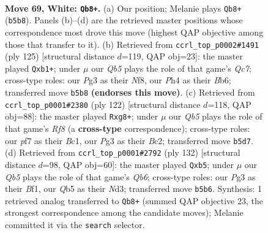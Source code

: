 \documentclass[11pt]{article}
\begin{document}
\clearpage

\begin{figure}[p]\centering
\begin{subfigure}{0.46\textwidth}\centering
\resizebox{\linewidth}{!}{%
\newchessgame
\chessboard[
  setfen={4k3/3q1p2/4bn2/1Q5n/1Bp4P/p4pP1/P6K/4R3 w - - 6 69},
  showmover=false,
  pgfstyle=straightmove, color=movearrow, markmove={b5-b8}
]}
\caption{}
\end{subfigure}\hfill
\begin{subfigure}{0.46\textwidth}\centering
\resizebox{\linewidth}{!}{%
\newchessgame
\chessboard[
  setfen={5n2/6pk/1b5p/p2QNP2/3P4/6PP/2q2B2/1R4K1 b - - 0 63},
  showmover=false,
  pgfstyle=straightmove, color=movearrow, markmove={c2-b1}
]}
\caption{}
\end{subfigure}
\\[4pt]
\begin{subfigure}{0.46\textwidth}\centering
\resizebox{\linewidth}{!}{%
\newchessgame
\chessboard[
  setfen={5Rrk/8/3p2q1/p2Pn3/Pbp1P1b1/6QP/2B5/2B4K w - - 1 62},
  showmover=false,
  pgfstyle=straightmove, color=movearrow, markmove={f8-g8}
]}
\caption{}
\end{subfigure}\hfill
\begin{subfigure}{0.46\textwidth}\centering
\resizebox{\linewidth}{!}{%
\newchessgame
\chessboard[
  setfen={8/5bk1/1Q2n1p1/1p1pP3/3q4/3N1pP1/5P2/5BK1 w - - 2 67},
  showmover=false,
  pgfstyle=straightmove, color=movearrow, markmove={b6-b5}
]}
\caption{}
\end{subfigure}
\caption{\textbf{Move 69, White: \texttt{Qb8+}.} (a) Our position; Melanie plays \texttt{Qb8+} (\texttt{b5b8}). Panels (b)--(d) are the retrieved master positions whose correspondence most drove this move (highest QAP objective among those that transfer to it). (b) Retrieved from \texttt{ccrl\_top\_p0002\#1491} (ply 125) [structural distance $d$=119, QAP obj=23]: the master played \texttt{Qxb1+}; under $\mu$ our \emph{Qb5} plays the role of that game's \emph{Qc7}; cross-type roles: our \emph{P}g3 as their \emph{N}f8, our \emph{P}h4 as their \emph{B}b6; transferred move \texttt{b5b8} \textbf{(endorses this move)}. (c) Retrieved from \texttt{ccrl\_top\_p0001\#2380} (ply 122) [structural distance $d$=118, QAP obj=88]: the master played \texttt{Rxg8+}; under $\mu$ our \emph{Qb5} plays the role of that game's \emph{Rf8} (a \textbf{cross-type} correspondence); cross-type roles: our \emph{p}f7 as their \emph{B}c1, our \emph{P}g3 as their \emph{B}c2; transferred move \texttt{b5d7}. (d) Retrieved from \texttt{ccrl\_top\_p0001\#2792} (ply 132) [structural distance $d$=98, QAP obj=60]: the master played \texttt{Qxb5}; under $\mu$ our \emph{Qb5} plays the role of that game's \emph{Qb6}; cross-type roles: our \emph{P}g3 as their \emph{B}f1, our \emph{Q}b5 as their \emph{N}d3; transferred move \texttt{b5b6}. Synthesis: 1 retrieved analog transferred to \texttt{Qb8+} (summed QAP objective 23, the strongest correspondence among the candidate moves); Melanie committed it via the \texttt{search} selector.}
\label{fig:thought-m136}
\end{figure}
\end{document}
